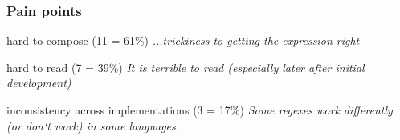%
%
%
%
%
%
%

\begin{frame}
\frametitle{Pain points}
\begin{block}{hard to compose (11 = 61\%)}
\emph{...trickiness to getting the expression right}
\end{block}
\begin{block}{hard to read (7 = 39\%)}
\emph{It is terrible to read (especially later after initial development) }
\end{block}
\begin{block}{inconsistency across implementations (3 = 17\%)}
\emph{Some regexes work differently (or don`t work) in some languages.}
\end{block}
\end{frame}

